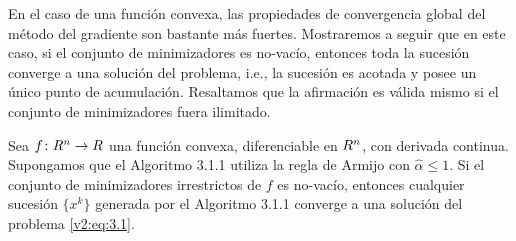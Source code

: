 
En el caso de una función convexa, las propiedades de convergencia global del método del gradiente son bastante más fuertes. Mostraremos a seguir que en este caso, si el conjunto de minimizadores es no-vacío, entonces toda la sucesión converge a una solución del problema, i.e., la sucesión es acotada y posee un único punto de acumulación. Resaltamos que la afirmación es válida mismo si el conjunto de minimizadores fuera ilimitado.

\begin{theorem}\label{v2:thm:3.1.3}
    Sea $f \colon R^n \to R$ una función convexa, diferenciable en $R^n$, con derivada continua. Supongamos que el Algoritmo 3.1.1 utiliza la regla de Armijo con $\hat{\alpha} \le 1$.
    Si el conjunto de minimizadores irrestrictos de $f$ es no-vacío, entonces cualquier sucesión $\{x^k\}$ generada por el Algoritmo 3.1.1 converge a una solución del problema \eqref{v2:eq:3.1}.
\end{theorem}
